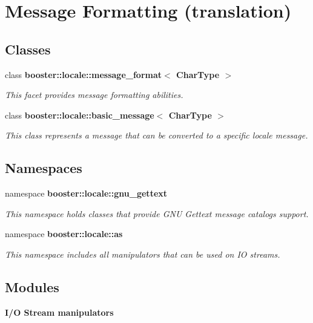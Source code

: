 \section{\-Message \-Formatting (translation)}
\label{group__message}
\subsection*{\-Classes}
\begin{DoxyCompactItemize}
\item 
class {\bf booster\-::locale\-::message\-\_\-format$<$ Char\-Type $>$}
\begin{DoxyCompactList}\small\item\em \-This facet provides message formatting abilities. \end{DoxyCompactList}\item 
class {\bf booster\-::locale\-::basic\-\_\-message$<$ Char\-Type $>$}
\begin{DoxyCompactList}\small\item\em \-This class represents a message that can be converted to a specific locale message. \end{DoxyCompactList}\end{DoxyCompactItemize}
\subsection*{\-Namespaces}
\begin{DoxyCompactItemize}
\item 
namespace {\bf booster\-::locale\-::gnu\-\_\-gettext}
\begin{DoxyCompactList}\small\item\em \-This namespace holds classes that provide \-G\-N\-U \-Gettext message catalogs support. \end{DoxyCompactList}\item 
namespace {\bf booster\-::locale\-::as}
\begin{DoxyCompactList}\small\item\em \-This namespace includes all manipulators that can be used on \-I\-O streams. \end{DoxyCompactList}\end{DoxyCompactItemize}
\subsection*{\-Modules}
\begin{DoxyCompactItemize}
\item 
{\bf \-I/\-O Stream manipulators}
\end{DoxyCompactItemize}
